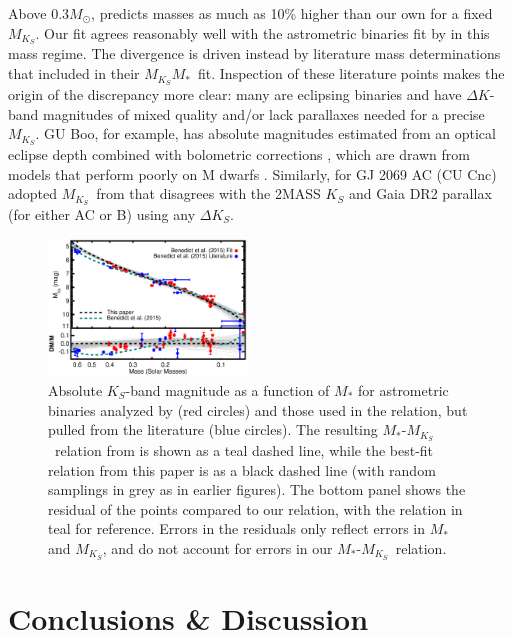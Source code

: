 \documentclass[twocolumn]{aastex62}
\newcommand{\mks}{$M_{K_S}$}
\newcommand{\mmk}{$M_{K_S}$\textendash$M_*$}
\begin{document}
 Above 0.3$M_\odot$, \citet{Benedict2016} predicts masses as much as 10\% higher than our own for a fixed \mks. Our fit agrees reasonably well with the astrometric binaries fit by \citet{Benedict2016} in this mass regime. The divergence is driven instead by literature mass determinations that \citet{Benedict2016} included in their \mmk\ fit. Inspection of these literature points makes the origin of the discrepancy more clear: many are eclipsing binaries and have $\Delta K$-band magnitudes of mixed quality and/or lack parallaxes needed for a precise \mks. GU Boo, for example, has absolute magnitudes estimated from an optical eclipse depth combined with bolometric corrections \citep{Lopez2005}, which are drawn from models that perform poorly on M dwarfs \citep{1998A&AS..130...65L,Hauschildt1999}. Similarly, for GJ 2069 AC (CU Cnc) \citet{Benedict2016} adopted \mks\ from \citet{Ribas2003} that disagrees with the 2MASS $K_S$ and Gaia DR2 parallax (for either AC or B) using any $\Delta K_S$. 


\begin{figure}[htb]
\begin{center}
\includegraphics[width=0.47\textwidth]{Benedict_comp.eps}
\caption{Absolute $K_S$-band magnitude as a function of $M_*$ for astrometric binaries analyzed by \citet{Benedict2016} (red circles) and those used in the \citet{Benedict2016} relation, but pulled from the literature (blue circles). The resulting $M_*$-\mks\ relation from \citet{Benedict2016} is shown as a teal dashed line, while the best-fit relation from this paper is as a black dashed line (with random samplings in grey as in earlier figures). The bottom panel shows the residual of the \citet{Benedict2016} points compared to our relation, with the \citet{Benedict2016} relation in teal for reference. Errors in the residuals only reflect errors in $M_*$ and \mks, and do not account for errors in our $M_*$-\mks\ relation. }
\label{fig:benedict}
\end{center}
\end{figure}

\section{Conclusions \& Discussion}\label{sec:discussion} 
\end{document}
